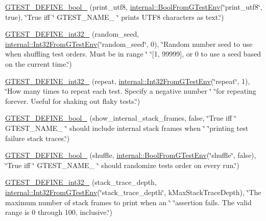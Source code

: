 \begin{DoxyCompactItemize}
\item 
\mbox{\hyperlink{namespacetesting_afdae92a76b2682c4d2ff524813bdfedf}{G\+T\+E\+S\+T\+\_\+\+D\+E\+F\+I\+N\+E\+\_\+bool\+\_\+}} (print\+\_\+utf8, \mbox{\hyperlink{namespacetesting_1_1internal_a67132cdce23fb71b6c38ee34ef81eb4c}{internal\+::\+Bool\+From\+G\+Test\+Env}}(\char`\"{}print\+\_\+utf8\char`\"{}, true), \char`\"{}True iff \char`\"{} G\+T\+E\+S\+T\+\_\+\+N\+A\+M\+E\+\_\+ \char`\"{} prints U\+T\+F8 characters as text.\char`\"{})
\item 
\mbox{\hyperlink{namespacetesting_a9900d8db2670a26999fbc2a9130f7185}{G\+T\+E\+S\+T\+\_\+\+D\+E\+F\+I\+N\+E\+\_\+int32\+\_\+}} (random\+\_\+seed, \mbox{\hyperlink{namespacetesting_1_1internal_a0f7e728793f9e6cb0aa2b69eaa468bf3}{internal\+::\+Int32\+From\+G\+Test\+Env}}(\char`\"{}random\+\_\+seed\char`\"{}, 0), \char`\"{}Random number seed to use when shuffling test orders.  Must be in range \char`\"{} \char`\"{}\mbox{[}1, 99999\mbox{]}, or 0 to use a seed based on the current time.\char`\"{})
\item 
\mbox{\hyperlink{namespacetesting_aae6f1140f03d7bf24067df0f6628e9ea}{G\+T\+E\+S\+T\+\_\+\+D\+E\+F\+I\+N\+E\+\_\+int32\+\_\+}} (repeat, \mbox{\hyperlink{namespacetesting_1_1internal_a0f7e728793f9e6cb0aa2b69eaa468bf3}{internal\+::\+Int32\+From\+G\+Test\+Env}}(\char`\"{}repeat\char`\"{}, 1), \char`\"{}How many times to repeat each test.  Specify a negative number \char`\"{} \char`\"{}for repeating forever.  Useful for shaking out flaky tests.\char`\"{})
\item 
\mbox{\hyperlink{namespacetesting_a60ef38aa9d1437f0d7818181897af8ef}{G\+T\+E\+S\+T\+\_\+\+D\+E\+F\+I\+N\+E\+\_\+bool\+\_\+}} (show\+\_\+internal\+\_\+stack\+\_\+frames, false, \char`\"{}True iff \char`\"{} G\+T\+E\+S\+T\+\_\+\+N\+A\+M\+E\+\_\+ \char`\"{} should include internal stack frames when \char`\"{} \char`\"{}printing test failure stack traces.\char`\"{})
\item 
\mbox{\hyperlink{namespacetesting_af95276e3deb9d243d729f3043eabd272}{G\+T\+E\+S\+T\+\_\+\+D\+E\+F\+I\+N\+E\+\_\+bool\+\_\+}} (shuffle, \mbox{\hyperlink{namespacetesting_1_1internal_a67132cdce23fb71b6c38ee34ef81eb4c}{internal\+::\+Bool\+From\+G\+Test\+Env}}(\char`\"{}shuffle\char`\"{}, false), \char`\"{}True iff \char`\"{} G\+T\+E\+S\+T\+\_\+\+N\+A\+M\+E\+\_\+ \char`\"{} should randomize tests\textquotesingle{} order on every run.\char`\"{})
\item 
\mbox{\hyperlink{namespacetesting_a84af642630c9181f00fcf0a4a63e795e}{G\+T\+E\+S\+T\+\_\+\+D\+E\+F\+I\+N\+E\+\_\+int32\+\_\+}} (stack\+\_\+trace\+\_\+depth, \mbox{\hyperlink{namespacetesting_1_1internal_a0f7e728793f9e6cb0aa2b69eaa468bf3}{internal\+::\+Int32\+From\+G\+Test\+Env}}(\char`\"{}stack\+\_\+trace\+\_\+depth\char`\"{}, k\+Max\+Stack\+Trace\+Depth), \char`\"{}The maximum number of stack frames to print when an \char`\"{} \char`\"{}assertion fails.  The valid range is 0 through 100, inclusive.\char`\"{})

\end{DoxyCompactItemize}
